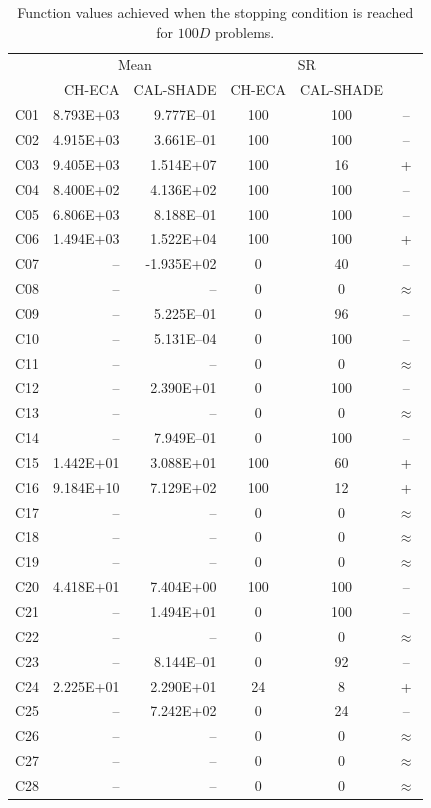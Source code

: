 \documentclass[conference]{IEEEtran}
\begin{document}
% 
% 
% 
\begin{table}[!ht]
	\caption{Function values achieved when the stopping condition is reached for $100D$ problems.}
	\centering
	\begin{tabular}{|c|r|r|c|c|c|}
	 \hline
	 &\multicolumn{2}{|c|}{Mean} & \multicolumn{2}{|c|}{SR} & \\
	\cline{2-5}
	 & CH-ECA & CAL-SHADE & CH-ECA & CAL-SHADE & \\ \hline

C01 & 8.793E+03 & 9.777E--01 &  100 &  100 & -- \\ 
C02 & 4.915E+03 & 3.661E--01 &  100 &  100 & -- \\ 
C03 & 9.405E+03 & 1.514E+07 &  100 &   16 & + \\ 
C04 & 8.400E+02 & 4.136E+02 &  100 &  100 & -- \\ 
C05 & 6.806E+03 & 8.188E--01 &  100 &  100 & -- \\ 
C06 & 1.494E+03 & 1.522E+04 &  100 &  100 & + \\ 
C07 &  -- & -1.935E+02 &    0 &   40 & -- \\ 
C08 &  -- &  -- &    0 &    0 & $\approx$ \\ 
C09 &  -- & 5.225E--01 &    0 &   96 & -- \\ 
C10 &  -- & 5.131E--04 &    0 &  100 & -- \\ 
C11 &  -- &  -- &    0 &    0 & $\approx$ \\ 
C12 &  -- & 2.390E+01 &    0 &  100 & -- \\ 
C13 &  -- &  -- &    0 &    0 & $\approx$ \\ 
C14 &  -- & 7.949E--01 &    0 &  100 & -- \\ 
C15 & 1.442E+01 & 3.088E+01 &  100 &   60 & + \\ 
C16 & 9.184E+10 & 7.129E+02 &  100 &   12 & + \\ 
C17 &  -- &  -- &    0 &    0 & $\approx$ \\ 
C18 &  -- &  -- &    0 &    0 & $\approx$ \\ 
C19 &  -- &  -- &    0 &    0 & $\approx$ \\ 
C20 & 4.418E+01 & 7.404E+00 &  100 &  100 & -- \\ 
C21 &  -- & 1.494E+01 &    0 &  100 & -- \\ 
C22 &  -- &  -- &    0 &    0 & $\approx$ \\ 
C23 &  -- & 8.144E--01 &    0 &   92 & -- \\ 
C24 & 2.225E+01 & 2.290E+01 &   24 &    8 & + \\ 
C25 &  -- & 7.242E+02 &    0 &   24 & -- \\ 
C26 &  -- &  -- &    0 &    0 & $\approx$ \\ 
C27 &  -- &  -- &    0 &    0 & $\approx$ \\ 
C28 &  -- &  -- &    0 &    0 & $\approx$ \\ 
   \hline
	\end{tabular}
	\label{tab:d100c}
\end{table}


\end{document}
